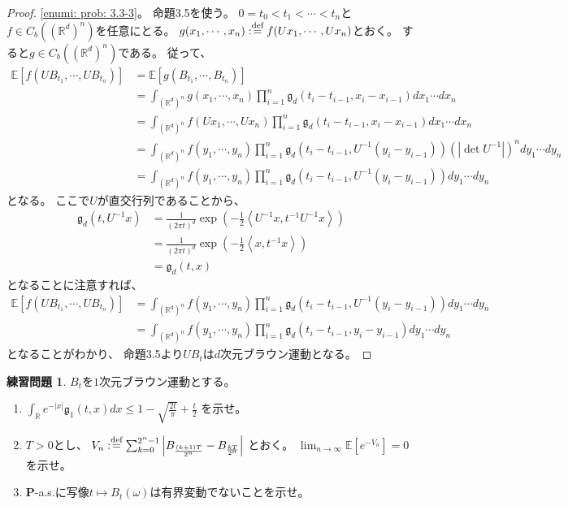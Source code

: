 \documentclass[uplatex]{jsarticle}
\theoremstyle{definition}
\newtheorem{prob}[prob]{練習問題}
\def\R{\mathbb{R}}
\def\P{\mathbf{P}}
\def\E{\mathbb{E}}
\def\dfn{:\overset{\mbox{{\scriptsize def}}}{=}}
\begin{document}
\begin{proof}
  \ref{enumi: prob: 3.3-3}。
  命題3.5を使う。
  \(0 = t_0 < t_1 < \cdots < t_n\)と
  \(f\in C_b((\R^d)^n)\)を任意にとる。
  \(g(x_1,\cdots,x_n) \dfn f(Ux_1,\cdots,Ux_n)\)とおく。
  すると\(g\in C_b((\R^d)^n)\)である。
  従って、
  \begin{align*}
    \E[f(UB_{t_1},\cdots,UB_{t_n})]
    &= \E[g(B_{t_1},\cdots,B_{t_n})] \\
    &= \int_{(\R^d)^n}g(x_1,\cdots,x_n)
    \prod_{i=1}^n\mathfrak{g}_d(t_i-t_{i-1},x_i-x_{i-1})dx_1\cdots dx_n \\
    &= \int_{(\R^d)^n}f(Ux_1,\cdots,Ux_n)
    \prod_{i=1}^n\mathfrak{g}_d(t_i-t_{i-1},x_i-x_{i-1})dx_1\cdots dx_n \\
    &= \int_{(\R^d)^n}f(y_1,\cdots,y_n)
    \prod_{i=1}^n\mathfrak{g}_d(t_i-t_{i-1},U^{-1}(y_i-y_{i-1}))
    (|\det U^{-1}|)^n dy_1\cdots dy_n \\
    &= \int_{(\R^d)^n}f(y_1,\cdots,y_n)
    \prod_{i=1}^n\mathfrak{g}_d(t_i-t_{i-1},U^{-1}(y_i-y_{i-1})) dy_1\cdots dy_n
  \end{align*}
  となる。
  ここで\(U\)が直交行列であることから、
  \begin{align*}
    \mathfrak{g}_d(t,U^{-1}x)
    &= \frac{1}{(2\pi t)^d}\exp \left(
    -\frac{1}{2}\left< U^{-1}x,t^{-1}U^{-1}x\right>\right) \\
    &= \frac{1}{(2\pi t)^d}\exp \left(
    -\frac{1}{2}\left< x,t^{-1}x\right>\right) \\
    &= \mathfrak{g}_d(t,x)
  \end{align*}
  となることに注意すれば、
  \begin{align*}
    \E[f(UB_{t_1},\cdots,UB_{t_n})]
    &= \int_{(\R^d)^n}f(y_1,\cdots,y_n)
    \prod_{i=1}^n\mathfrak{g}_d(t_i-t_{i-1},U^{-1}(y_i-y_{i-1})) dy_1\cdots dy_n \\
    &= \int_{(\R^d)^n}f(y_1,\cdots,y_n)
    \prod_{i=1}^n\mathfrak{g}_d(t_i-t_{i-1},y_i-y_{i-1}) dy_1\cdots dy_n
  \end{align*}
  となることがわかり、
  命題3.5より\(UB_t\)は\(d\)次元ブラウン運動となる。
\end{proof}














\begin{prob}\label{prob: 3.4}
  \(B_t\)を\(1\)次元ブラウン運動とする。
  \begin{enumerate}
    \item \label{enumi: prob: 3.4-1}
    \(\int_{\R}e^{-|x|}\mathfrak{g}_1(t,x)dx
    \leq 1-\sqrt{\frac{2t}{\pi}} + \frac{t}{2}\)
    を示せ。
    \item \label{enumi: prob: 3.4-2}
    \(T>0\)とし、
    \(V_n \dfn \sum_{k=0}^{2^n-1}
    \left| B_{\frac{(k+1)T}{2^n}}-B_{\frac{kT}{2^n}}\right|\)
    とおく。
    \(\lim_{n\to \infty}\E\left[e^{-V_n}\right] = 0\)を示せ。
    \item \label{enumi: prob: 3.4-3}
    \(\P\)-a.s.に写像\(t\mapsto B_t(\omega)\)は有界変動でないことを示せ。
  \end{enumerate}
\end{prob}
\end{document}
